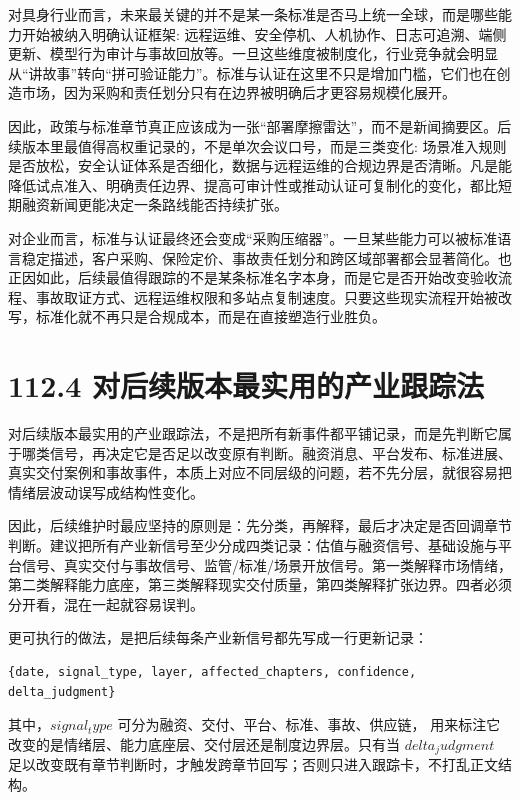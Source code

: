 对具身行业而言，未来最关键的并不是某一条标准是否马上统一全球，而是哪些能力开始被纳入明确认证框架: 远程运维、安全停机、人机协作、日志可追溯、端侧更新、模型行为审计与事故回放等。一旦这些维度被制度化，行业竞争就会明显从“讲故事”转向“拼可验证能力”。标准与认证在这里不只是增加门槛，它们也在创造市场，因为采购和责任划分只有在边界被明确后才更容易规模化展开。

因此，政策与标准章节真正应该成为一张“部署摩擦雷达”，而不是新闻摘要区。后续版本里最值得高权重记录的，不是单次会议口号，而是三类变化: 场景准入规则是否放松，安全认证体系是否细化，数据与远程运维的合规边界是否清晰。凡是能降低试点准入、明确责任边界、提高可审计性或推动认证可复制化的变化，都比短期融资新闻更能决定一条路线能否持续扩张。

对企业而言，标准与认证最终还会变成“采购压缩器”。一旦某些能力可以被标准语言稳定描述，客户采购、保险定价、事故责任划分和跨区域部署都会显著简化。也正因如此，后续最值得跟踪的不是某条标准名字本身，而是它是否开始改变验收流程、事故取证方式、远程运维权限和多站点复制速度。只要这些现实流程开始被改写，标准化就不再只是合规成本，而是在直接塑造行业胜负。

\section*{112.4 对后续版本最实用的产业跟踪法}


对后续版本最实用的产业跟踪法，不是把所有新事件都平铺记录，而是先判断它属于哪类信号，再决定它是否足以改变原有判断。融资消息、平台发布、标准进展、真实交付案例和事故事件，本质上对应不同层级的问题，若不先分层，就很容易把情绪层波动误写成结构性变化。

因此，后续维护时最应坚持的原则是：先分类，再解释，最后才决定是否回调章节判断。建议把所有产业新信号至少分成四类记录：估值与融资信号、基础设施与平台信号、真实交付与事故信号、监管/标准/场景开放信号。第一类解释市场情绪，第二类解释能力底座，第三类解释现实交付质量，第四类解释扩张边界。四者必须分开看，混在一起就容易误判。

更可执行的做法，是把后续每条产业新信号都先写成一行更新记录：

\begin{lstlisting}
{date, signal_type, layer, affected_chapters, confidence, delta_judgment}
\end{lstlisting}

其中，\(signal_type\) 可分为融资、交付、平台、标准、事故、供应链，\texttt{} 用来标注它改变的是情绪层、能力底座层、交付层还是制度边界层。只有当 \(delta_judgment\) 足以改变既有章节判断时，才触发跨章节回写；否则只进入跟踪卡，不打乱正文结构。

